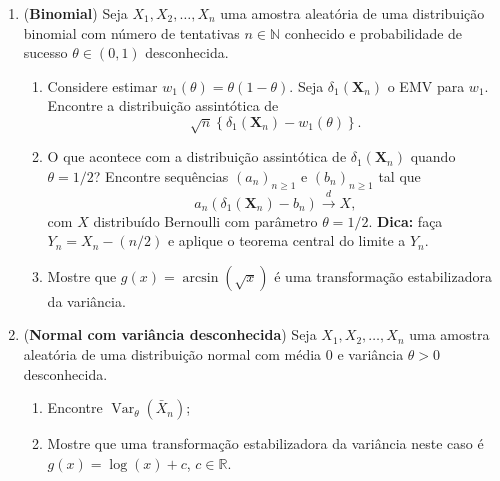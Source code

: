 \documentclass[a4paper,10pt, notitlepage]{report}
\newcommand{\vr}{\operatorname{Var}} %
\newcommand{\rs}{X_1, X_2, \ldots, X_n} %
\newcommand{\bX}{\boldsymbol{X}} %
\begin{document}
\begin{enumerate}
 \item (\textbf{Binomial}) Seja $\rs$ uma amostra aleatória de uma distribuição binomial com número de tentativas $n \in \mathbb{N}$ conhecido e probabilidade de sucesso $\theta \in (0, 1)$ desconhecida.
 \begin{enumerate}
     \item Considere estimar $w_1(\theta) = \theta(1-\theta)$.
     Seja $\delta_1(\bX_n)$ o EMV para $w_1$.
     Encontre a distribuição assintótica de 
     \begin{equation*}
        \sqrt{n}\left\{\delta_1(\bX_n) - w_1(\theta)\right\}.
     \end{equation*}
     \item O que acontece com a distribuição assintótica de $\delta_1(\bX_n)$ quando $\theta = 1/2$? Encontre sequências $(a_n)_{n\geq1}$ e $(b_n)_{n\geq1}$ tal que 
     \begin{equation*}
         a_n\left(\delta_1(\bX_n) - b_n\right) \xrightarrow{d} X,
     \end{equation*}
     com $X$ distribuído Bernoulli com parâmetro $\theta = 1/2$.
     \textbf{Dica:} faça $Y_n = X_n-(n/2)$ e aplique o teorema central do limite a $Y_n$. 
     \item Mostre que $g(x) = \arcsin(\sqrt{x})$ é uma transformação estabilizadora da variância.
 \end{enumerate}
 \item (\textbf{Normal com variância desconhecida}) 
 Seja $\rs$ uma amostra aleatória de uma distribuição normal com média 0 e variância $\theta >0$ desconhecida. 
 \begin{enumerate}
         \item Encontre $\vr_\theta(\bar{X}_n)$;
         \item Mostre que uma transformação estabilizadora da variância neste caso é $g(x) = \log(x) + c$, $c \in \mathbb{R}$.
 \end{enumerate}
 
\end{enumerate}
% 
% 
\end{document}
